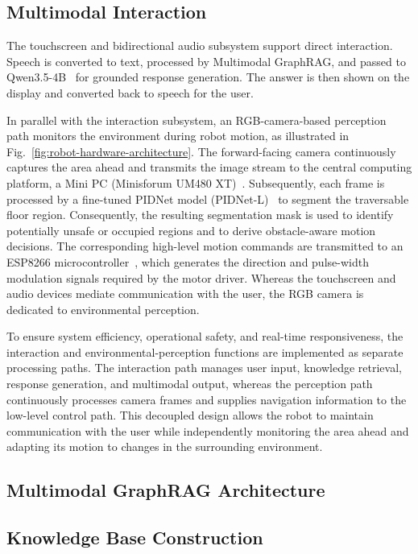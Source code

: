 \documentclass[conference]{IEEEtran}
\begin{document}
\subsection{Multimodal Interaction}

The touchscreen and bidirectional audio subsystem support direct interaction.
Speech is converted to text, processed by Multimodal GraphRAG, and passed to
Qwen3.5-4B~\cite{qwen2026qwen35} for grounded response generation. The answer
is then shown on the display and converted back to speech for the user.

In parallel with the interaction subsystem, an RGB-camera-based perception path
monitors the environment during robot motion, as illustrated in
Fig.~\ref{fig:robot-hardware-architecture}. The forward-facing camera
continuously captures the area ahead and transmits the image stream to the
central computing platform, a Mini PC (Minisforum UM480
XT)~\cite{minisforum2026um480xt}. Subsequently, each frame is processed by a
fine-tuned PIDNet model (PIDNet-L)~\cite{xu2023pidnet} to segment the
traversable floor region. Consequently, the resulting segmentation mask is used
to identify potentially unsafe or occupied regions and to derive obstacle-aware
motion decisions. The corresponding high-level motion commands are transmitted
to an ESP8266 microcontroller~\cite{espressif2021esp8266}, which generates the
direction and pulse-width modulation signals required by the motor driver.
Whereas the touchscreen and audio devices mediate communication with the user,
the RGB camera is dedicated to environmental perception.

To ensure system efficiency, operational safety, and real-time responsiveness,
the interaction and environmental-perception functions are implemented as
separate processing paths. The interaction path manages user input, knowledge
retrieval, response generation, and multimodal output, whereas the perception
path continuously processes camera frames and supplies navigation information to
the low-level control path. This decoupled design allows the robot to maintain
communication with the user while independently monitoring the area ahead and
adapting its motion to changes in the surrounding environment.

\subsection{Multimodal GraphRAG Architecture}

\subsection{Knowledge Base Construction}
\end{document}
